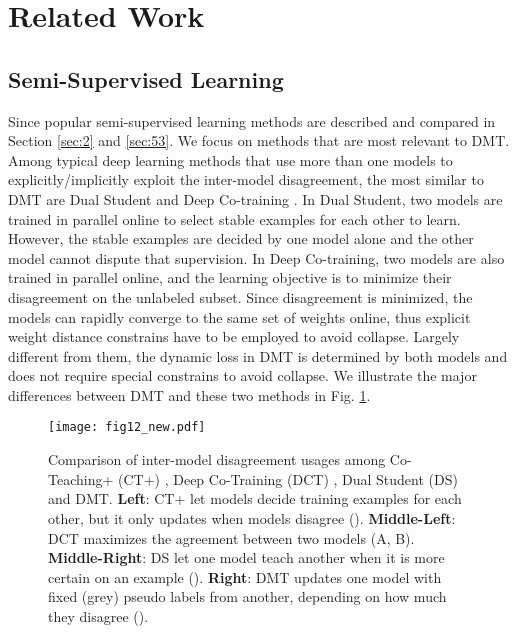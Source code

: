 \documentclass[preprint,review,10pt]{elsarticle}
\begin{document}
\section{Related Work}
\label{sec:6}
\subsection{Semi-Supervised Learning}
\label{sec:61}
Since popular semi-supervised learning methods are described and compared in Section \ref{sec:2} and \ref{sec:53}. We focus on methods that are most relevant to DMT. Among typical deep learning methods that use more than one models to explicitly/implicitly exploit the inter-model disagreement, the most similar to DMT are Dual Student \cite{ke2019dual} and Deep Co-training \cite{qiao2018deep}. In Dual Student, two models are trained in parallel online to select stable examples for each other to learn. However, the stable examples are decided by one model alone and the other model cannot dispute that supervision. In Deep Co-training, two models are also trained in parallel online, and the learning objective is to minimize their disagreement on the unlabeled subset. Since disagreement is minimized, the models can rapidly converge to the same set of weights online, thus explicit weight distance constrains have to be employed to avoid collapse. Largely different from them, the dynamic loss in DMT is determined by both models and does not require special constrains to avoid collapse. We illustrate the major differences between DMT and these two methods in Fig. \ref{fig7}.


\begin{figure}[t]
\centering
\texttt{[image: fig12\_new.pdf]}
\caption{Comparison of inter-model disagreement usages among Co-Teaching+ (CT+) \cite{yu2019does}, Deep Co-Training (DCT) \cite{qiao2018deep}, Dual Student (DS) \cite{ke2019dual} and DMT. \textbf{Left}: CT+ let models decide training examples for each other, but it only updates when models disagree (). \textbf{Middle-Left}: DCT maximizes the agreement between two models (A, B). \textbf{Middle-Right}: DS let one model teach another when it is more certain on an example (). \textbf{Right}: DMT updates one model with fixed (grey) pseudo labels from another, depending on how much they disagree (). }
\label{fig7}
\end{figure}
\end{document}
